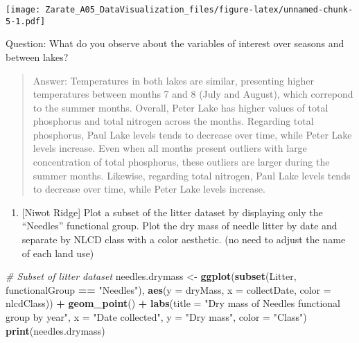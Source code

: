 \documentclass[
]{article}
\newenvironment{Shaded}{\begin{snugshade}}{\end{snugshade}}
\newcommand{\CommentTok}[1]{\textcolor[rgb]{0.56,0.35,0.01}{\textit{#1}}}
\newcommand{\DataTypeTok}[1]{\textcolor[rgb]{0.13,0.29,0.53}{#1}}
\newcommand{\KeywordTok}[1]{\textcolor[rgb]{0.13,0.29,0.53}{\textbf{#1}}}
\newcommand{\NormalTok}[1]{#1}
\newcommand{\OperatorTok}[1]{\textcolor[rgb]{0.81,0.36,0.00}{\textbf{#1}}}
\newcommand{\StringTok}[1]{\textcolor[rgb]{0.31,0.60,0.02}{#1}}
\providecommand{\tightlist}{%
  \setlength{\itemsep}{0pt}\setlength{\parskip}{0pt}}
\begin{document}
\texttt{[image: Zarate\_A05\_DataVisualization\_files/figure-latex/unnamed-chunk-5-1.pdf]}

Question: What do you observe about the variables of interest over
seasons and between lakes?

\begin{quote}
Answer: Temperatures in both lakes are similar, presenting higher
temperatures between months 7 and 8 (July and August), which correpond
to the summer months. Overall, Peter Lake has higher values of total
phosphorus and total nitrogen across the months. Regarding total
phosphorus, Paul Lake levels tends to decrease over time, while Peter
Lake levels increase. Even when all months present outliers with large
concentration of total phosphorus, these outliers are larger during the
summer months. Likewise, regarding total nitrogen, Paul Lake levels
tends to decrease over time, while Peter Lake levels increase.
\end{quote}

\begin{enumerate}
\def\labelenumi{\arabic{enumi}.}
\setcounter{enumi}{5}
\tightlist
\item
  {[}Niwot Ridge{]} Plot a subset of the litter dataset by displaying
  only the ``Needles'' functional group. Plot the dry mass of needle
  litter by date and separate by NLCD class with a color aesthetic. (no
  need to adjust the name of each land use)
\end{enumerate}

\begin{Shaded}
\begin{Highlighting}[]
\CommentTok{# Subset of litter dataset }
\NormalTok{needles.drymass <-}\StringTok{ }\KeywordTok{ggplot}\NormalTok{(}\KeywordTok{subset}\NormalTok{(Litter, functionalGroup }\OperatorTok{==}\StringTok{ "Needles"}\NormalTok{),}
                \KeywordTok{aes}\NormalTok{(}\DataTypeTok{y =}\NormalTok{ dryMass, }\DataTypeTok{x =}\NormalTok{ collectDate, }\DataTypeTok{color =}\NormalTok{ nlcdClass)) }\OperatorTok{+}
\StringTok{  }\KeywordTok{geom_point}\NormalTok{() }\OperatorTok{+}
\StringTok{  }\KeywordTok{labs}\NormalTok{(}\DataTypeTok{title =} \StringTok{"Dry mass of Needles functional group by year"}\NormalTok{,}
       \DataTypeTok{x =} \StringTok{"Date collected"}\NormalTok{, }\DataTypeTok{y =} \StringTok{"Dry mass"}\NormalTok{, }\DataTypeTok{color =} \StringTok{"Class"}\NormalTok{) }
\KeywordTok{print}\NormalTok{(needles.drymass)}
\end{Highlighting}
\end{Shaded}
\end{document}
